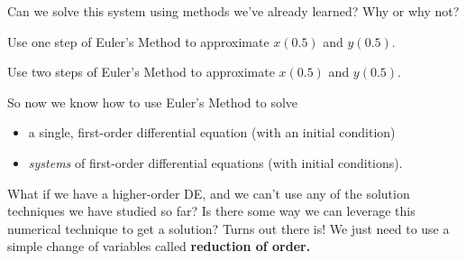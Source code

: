  \item  Can we solve this system using methods we've already learned?  Why or why not?
  \\ \vspace{1in}
\newpage
 \item  Use one step of Euler's Method to approximate $x(0.5)$ and $y(0.5).$\\ \vspace{2in}


 \item  Use two steps of Euler's Method to approximate $x(0.5)$ and $y(0.5).$\\ \vfill


 \een
\een

\noindent  So now we know how to use Euler's Method to solve
 \begin{itemize}
 \item  a single, first-order differential equation (with an initial condition)
 \item {\it systems} of first-order differential equations (with initial conditions).
 \end{itemize}

\noindent  What if we have a higher-order DE, and we can't use any of the solution techniques
we have studied so far?  Is there some way we can leverage this numerical technique to get a
solution?  Turns out there is!  We just need to use a simple change of variables called
{\bf reduction of order.}\\ \vspace{1cm}

